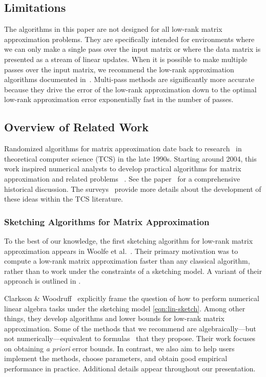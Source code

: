 \documentclass[final]{siamart1116}
\numberwithin{equation}{section}
\numberwithin{theorem}{section}
\numberwithin{figure}{section}
\begin{document}
\subsection{Limitations}
\label{sec:limitations}

The algorithms in this paper are not designed for all low-rank matrix
approximation problems.  They are specifically intended for environments
where we can only make a single pass over the input matrix or where
the data matrix is presented as a stream of linear updates.
When it is possible to make multiple passes over the input matrix, we recommend
the low-rank approximation algorithms documented in~\cite{HMT11:Finding-Structure}.
Multi-pass methods are significantly more accurate because they drive the error
of the low-rank approximation down to the optimal low-rank approximation error
exponentially fast in the number of passes.


\subsection{Overview of Related Work}
\label{sec:related}

Randomized algorithms for matrix approximation date back
to research~\cite{PRTV00:Latent-Semantic,FKV04:Fast-Monte-Carlo}
in theoretical computer science (TCS) in the late 1990s.
Starting around 2004, this work inspired numerical
analysts to develop practical algorithms for
matrix approximation and related problems
~\cite{MRT11:Randomized-Algorithm}.
See the paper~\cite[Sec.~2]{HMT11:Finding-Structure} for
a comprehensive historical discussion.
The surveys~\cite{Mah11:Randomized-Algorithms,Woo14:Sketching-Tool}
provide more details about the development of these ideas within the TCS literature.

\subsubsection{Sketching Algorithms for Matrix Approximation}

To the best of our knowledge, the first sketching algorithm
for low-rank matrix approximation appears in
Woolfe et al.~\cite[Sec.~5.2]{WLRT08:Fast-Randomized}.
Their primary motivation was to compute a low-rank matrix approximation faster than
any classical algorithm, rather than to work under the constraints of a sketching model. A variant of their approach is outlined in \cite[Sec.~5.5]{HMT11:Finding-Structure}.

Clarkson \& Woodruff~\cite{CW09:Numerical-Linear}
explicitly frame the question of how to perform numerical linear algebra tasks
under the sketching model \cref{eqn:lin-sketch}.
Among other things, they develop algorithms and lower bounds
for low-rank matrix approximation.
Some of the methods that we recommend are
algebraically---but not numerically---equivalent
to formulas~\cite[Thm.~4.7, 4.8]{CW09:Numerical-Linear}
that they propose.
Their work focuses on obtaining \emph{a priori} error bounds.
In contrast, we also aim to help users
implement the methods, choose parameters, and obtain
good empirical performance in practice.
Additional details appear throughout our presentation.
\end{document}
